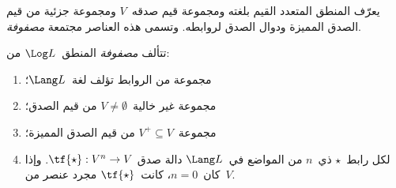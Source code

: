 \documentclass[../../../include/open-logic-section]{subfiles}
\begin{document}


يعرّف المنطق المتعدد القيم بلغته ومجموعة قيم صدقه~$V$ ومجموعة جزئية
من قيم الصدق المميزة ودوال الصدق لروابطه. وتسمى هذه العناصر مجتمعة
\emph{مصفوفة}.

\begin{defn}[المصفوفة]
تتألف \emph{مصفوفة} المنطق~$\Log L$ من:
\begin{enumerate}
\item مجموعة من الروابط تؤلف لغة~$\Lang L$؛
\item مجموعة غير خالية~$V \neq \emptyset$ من قيم الصدق؛
\item مجموعة~$V^+ \subseteq V$ من قيم الصدق المميزة؛
\item لكل رابط~$\star$ ذي~$n$ من المواضع في~$\Lang L$ دالة صدق
$\tf{\star} : V^n \to V$. وإذا كان~$n = 0$، كانت~$\tf{\star}$ مجرد
عنصر من~$V$.
\end{enumerate}
\end{defn}
\end{document}

